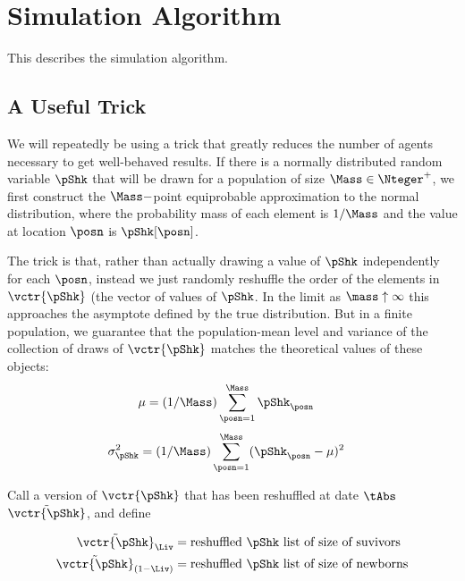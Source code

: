 \documentclass[../BufferStockTheory.tex]{subfiles}\usepackage{ApndxSteadyState}
\begin{document}
  \section{Simulation Algorithm}

  This describes the simulation algorithm.

  \subsection{A Useful Trick}

  We will repeatedly be using a trick that greatly reduces the number of agents necessary to get well-behaved results.  If there is a normally distributed random variable $\pShk$ that will be drawn for a population of size $\Mass \in \Nteger^{+}$, we first construct the $\Mass-$point equiprobable approximation to the normal distribution, where the probability mass of each element is $1/\Mass$ and the value at location $\posn$ is $\pShk[\posn]$.

  The trick is that, rather than actually drawing a value of $\pShk$ independently for each $\posn$, instead we just randomly reshuffle the order of the elements in $\vctr{\pShk}$ (the vector of values of $\pShk$.  In the limit as $\mass \uparrow \infty$ this approaches the asymptote defined by the true distribution.  But in a finite population, we guarantee that the population-mean level and variance of the collection of draws of $\vctr{\pShk}$ matches the theoretical values of these objects:
  \begin{equation}\begin{gathered}\begin{aligned}
    \mu & = (1/\Mass)\sum_{\posn=1}^{\Mass}\pShk_{\posn}
  \end{aligned}\end{gathered}\end{equation}
  \begin{equation}\begin{gathered}\begin{aligned}
    \sigma^{2}_{\pShk} & = (1/\Mass)\sum_{\posn=1}^{\Mass}(\pShk_{\posn} - \mu)^{2}
  \end{aligned}\end{gathered}\end{equation}

  Call a version of $\vctr{\pShk}$ that has been reshuffled at date $\tAbs$ $\tilde{\vctr{\pShk}}$, and define

  \newcommand{\pShkOldRemix}{\tilde{\vctr{\pShk}}_{\Liv}}
  \newcommand{\pShkNewRemix}{\tilde{\vctr{\pShk}}_{\Die}}
  \begin{equation}\begin{gathered}\begin{aligned}
    \pShkOldRemix & = \text{reshuffled $\pShk$ list of size of suvivors} 
    \\  \pShkNewRemix & = \text{reshuffled $\pShk$ list of size of newborns}
  \end{aligned}\end{gathered}\end{equation}
\end{document}
